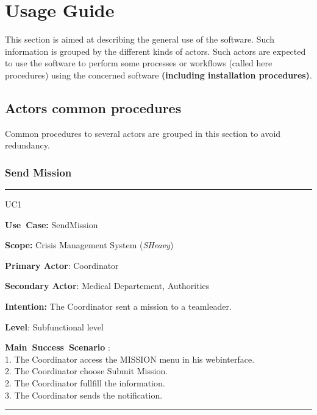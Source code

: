 \chapter{Usage Guide}
\label{chap:usage_guide}

This section is aimed at describing the general use of the software. Such
information is grouped by the different kinds of actors.
Such actors are expected to use the software to perform some
processes or workflows (called here procedures) using the concerned software
\textbf{(including installation procedures)}.

\section{Actors common procedures}
Common procedures to several actors are grouped in this section to avoid
redundancy.


\subsection{Send Mission}
\vspace{0.5cm}
\hrule
\vspace{0.5cm}
\begin{lyxlist}{UC1}
\small{
\item [\textbf{Use~Case:}] SendMission
\item [\textbf{Scope:}] Crisis Management System (\emph{SHeavy})
\item [\textbf{Primary Actor}:] Coordinator
\item [\textbf{Secondary Actor}:] Medical Departement, Authorities
\item [\textbf{Intention:}]The Coordinator sent a mission to a teamleader.
\item [\textbf{Level}:]Subfunctional level
\item [\textbf{Main~Success~Scenario}]:\\
1. The Coordinator access the MISSION menu in his webinterface.\\
2. The Coordinator choose Submit Mission.\\
2. The Coordinator fullfill the information.\\
3. The Coordinator sends the notification.\\
}
\end{lyxlist}
\hrule 
\vspace{0.5cm} 


